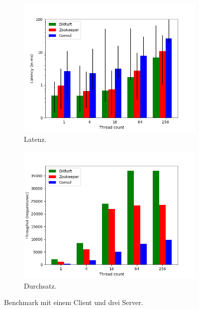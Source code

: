 \begin{figure}[t]
	\centering
	\begin{subfigure}[t]{0.45\textwidth}
		\includegraphics[width=\textwidth]{img/latency.png}
		\caption{Latenz.}
		\label{fig:latency}
	\end{subfigure}
	\begin{subfigure}[t]{0.45\textwidth}
		\includegraphics[width=\textwidth]{img/throughput.png}
		\caption{Durchsatz.}
		\label{fig:throughput}
	\end{subfigure}
	\caption{Benchmark mit einem Client und drei Server.}
\end{figure}

